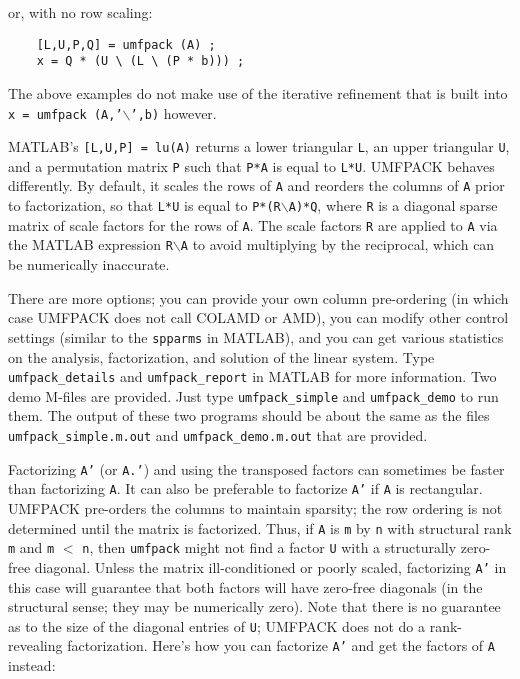 \documentclass[11pt]{article}
\begin{document}
or, with no row scaling:

{\footnotesize
\begin{verbatim}
    [L,U,P,Q] = umfpack (A) ;
    x = Q * (U \ (L \ (P * b))) ;
\end{verbatim}
}

The above examples do not make use of the iterative refinement
that is built into
{\tt x = }{\tt umfpack (A,'}$\backslash${\tt ',b)}
however.

MATLAB's {\tt [L,U,P] = lu(A)} returns a lower triangular {\tt L}, an upper
triangular {\tt U}, and a permutation matrix {\tt P} such that {\tt P*A} is
equal to {\tt L*U}.  UMFPACK behaves differently.  By default, it scales
the rows of {\tt A} and reorders the columns of {\tt A} prior to
factorization, so that {\tt L*U} is equal to {\tt P*(R}$\backslash${\tt A)*Q},
where {\tt R} is a diagonal sparse matrix of scale factors for the rows
of {\tt A}.  The scale factors {\tt R} are applied to {\tt A} via the MATLAB
expression {\tt R}$\backslash${\tt A} to avoid multiplying by
the reciprocal, which can be numerically inaccurate.

There are more options; you can provide your own column pre-ordering (in which
case UMFPACK does not call COLAMD or AMD), you can modify other control settings
(similar to the {\tt spparms} in MATLAB), and you can get various statistics on
the analysis, factorization, and solution of the linear system.  Type
{\tt umfpack\_details} and {\tt umfpack\_report} in MATLAB for more
information.  Two demo M-files are provided.   Just type {\tt umfpack\_simple}
and {\tt umfpack\_demo} to run them.
The output of these two programs should be about the same
as the files {\tt umfpack\_simple.m.out} and {\tt umfpack\_demo.m.out}
that are provided.

Factorizing {\tt A'} (or {\tt A.'}) and using the transposed factors can
sometimes be faster than factorizing {\tt A}.  It can also be preferable to
factorize {\tt A'} if {\tt A} is rectangular.  UMFPACK pre-orders the columns
to maintain sparsity; the row ordering is not determined until the matrix
is factorized.  Thus, if {\tt A} is {\tt m} by {\tt n} with structural
rank {\tt m}
and {\tt m} $<$ {\tt n}, then {\tt umfpack} might not find a factor
{\tt U} with a structurally zero-free diagonal.
Unless the matrix ill-conditioned or
poorly scaled, factorizing {\tt A'} in this case will guarantee that both
factors will have zero-free diagonals (in the structural sense; they may
be numerically zero).  Note that there is no guarantee
as to the size of the diagonal entries of {\tt U}; UMFPACK does not do a
rank-revealing factorization.  Here's how you can factorize {\tt A'}
and get the factors of {\tt A} instead:
\end{document}
